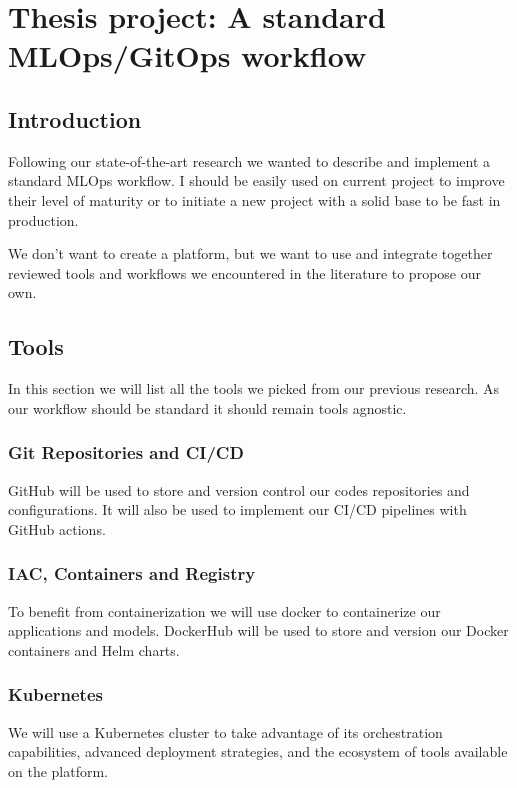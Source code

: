 \chapter{Thesis project: A standard MLOps/GitOps workflow}\label{ch:thesis-project:-a-standard-mlops-ci/cd-workflow}
\section{Introduction}\label{sec:introduction}
Following our state-of-the-art research we wanted to describe and implement a standard MLOps workflow.
I should be easily used on current project to improve their level of maturity or to initiate a new project with a solid
base to be fast in production.

We don't want to create a platform, but we want to use and integrate together reviewed
tools and workflows we encountered in the literature to propose our own.

\section{Tools}\label{sec:tools2}
In this section we will list all the tools we picked from our previous research.
As our workflow should be standard it should remain tools agnostic.

\subsection{Git Repositories and CI/CD}\label{subsec:github}
GitHub will be used to store and version control our codes repositories and configurations.
It will also be used to implement our CI/CD pipelines with GitHub actions.

\subsection{IAC, Containers and Registry}\label{subsec:dockerhub}
To benefit from containerization we will use docker to containerize our applications and models.
DockerHub will be used to store and version our Docker containers and Helm charts.

\subsection{Kubernetes}\label{subsec:kubernetes}
We will use a Kubernetes cluster to take advantage of its orchestration capabilities, advanced deployment strategies,
and the ecosystem of tools available on the platform.

